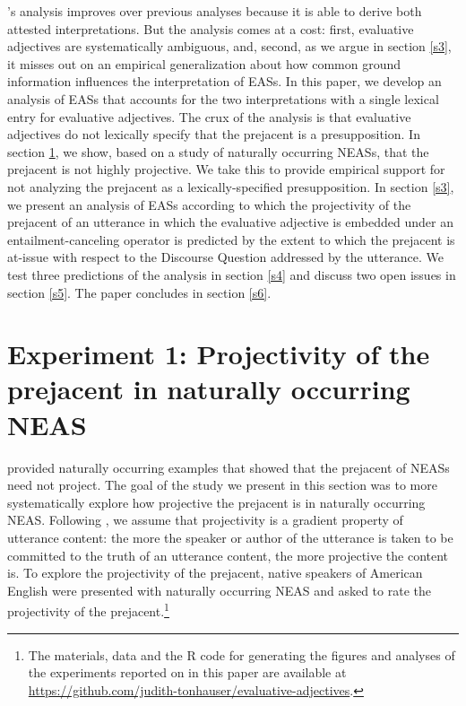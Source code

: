 \documentclass[11pt,fleqn]{article}
\newcommand{\6}{\mbox{$[\hspace*{-.6mm}[$}}
\newcommand{\9}{\mbox{$]\hspace*{-.6mm}]$}}
\newcommand{\citepos}[1]{\citeauthor{#1}'s \citeyear{#1}}
\begin{document}
\citepos{karttunen-etal2014} analysis improves over previous analyses because it is able to derive both attested interpretations. But the analysis comes at a cost: first, evaluative adjectives are systematically ambiguous, and, second, as we argue in section \ref{s3}, it misses out on an empirical generalization about how common ground information  influences the interpretation of EASs. In this paper, we develop an analysis of EASs that accounts for the two interpretations with a single lexical entry for evaluative adjectives. The crux of the analysis is that evaluative adjectives do not lexically specify that the prejacent is a presupposition. In section \ref{s2}, we show, based on a study of naturally occurring NEASs, that the prejacent is not highly projective. We take this to provide empirical support for not analyzing the prejacent as a lexically-specified presupposition. In section \ref{s3}, we present an analysis of EASs according to which the projectivity of the prejacent of an utterance in which the evaluative adjective is embedded under an entailment-canceling operator is predicted by the extent to which the prejacent is at-issue with respect to the Discourse Question addressed by the utterance. We test three predictions of the analysis in section \ref{s4} and discuss two open issues in section \ref{s5}. The paper concludes in section \ref{s6}.

\section{Experiment 1: Projectivity of the prejacent in naturally occurring NEAS}\label{s2}

\citet{karttunen-etal2014} provided naturally occurring examples that showed that the prejacent of NEASs need not project. The goal of the study we present in this section was to more systematically explore how projective the prejacent is in naturally occurring NEAS. Following \citealt{tbd-variability}, we assume that projectivity is a gradient property of utterance content: the more the speaker or author of the utterance is taken to be committed to the truth of an utterance content, the more projective the content is. To explore the projectivity of the prejacent, native speakers of American English were presented with naturally occurring NEAS and asked to rate the projectivity of the prejacent.\footnote{\label{f-git}The
materials, data and the R code for generating the figures and analyses of the experiments reported on in this paper are available at
\url{https://github.com/judith-tonhauser/evaluative-adjectives}.} 
\end{document}
